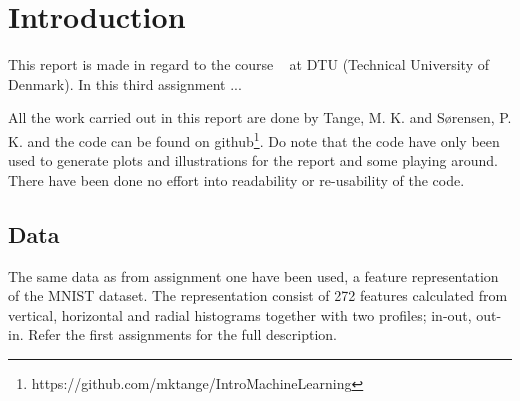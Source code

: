 \chapter{Introduction}
This report is made in regard to the course \textsf{\courseno\ \coursename} at DTU (Technical University of Denmark). In this third assignment ...


All the work carried out in this report are done by Tange, M. K. and Sørensen, P. K. and the code can be found on github\footnote{https://github.com/mktange/IntroMachineLearning}. Do note that the code have only been used to generate plots and illustrations for the report and some playing around. There have been done no effort into readability or re-usability of the code.

\section{Data}
The same data as from assignment one have been used, a feature representation of the MNIST dataset. The representation consist of 272 features calculated from vertical, horizontal and radial histograms together with two profiles; in-out, out-in. Refer the first assignments for the full description. 